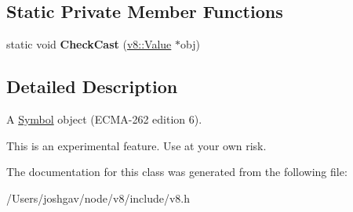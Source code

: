\subsection*{Static Private Member Functions}
\begin{DoxyCompactItemize}
\item 
static void {\bfseries Check\+Cast} (\hyperlink{classv8_1_1_value}{v8\+::\+Value} $\ast$obj)\hypertarget{classv8_1_1_symbol_object_ae3e8e6b56b7893acc3deb924b653e349}{}\label{classv8_1_1_symbol_object_ae3e8e6b56b7893acc3deb924b653e349}

\end{DoxyCompactItemize}


\subsection{Detailed Description}
A \hyperlink{classv8_1_1_symbol}{Symbol} object (E\+C\+M\+A-\/262 edition 6).

This is an experimental feature. Use at your own risk. 

The documentation for this class was generated from the following file\+:\begin{DoxyCompactItemize}
\item 
/\+Users/joshgav/node/v8/include/v8.\+h\end{DoxyCompactItemize}

